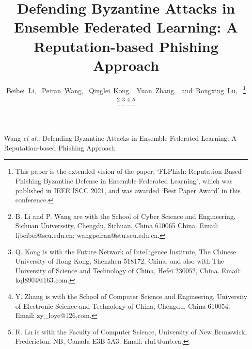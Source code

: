\documentclass[journal]{IEEEtran}
\begin{document}
\title{Defending Byzantine Attacks in Ensemble Federated Learning: A Reputation-based Phishing Approach}


\author{Beibei~Li,~
        Peiran~Wang,~
        Qinglei~Kong,~
        Yuan~Zhang,~
        and~Rongxing~Lu,~
\thanks{This paper is the extended vision of the paper, `FLPhish: Reputation-Based Phishing Byzantine Defense in Ensemble Federated Learning', which was published in IEEE ISCC 2021, and was awarded `Best Paper Award' in this conference.}
\thanks{B. Li and P. Wang are with the School of Cyber Science and Engineering, Sichuan Universsity, Chengdu, Sichuan, China 610065 China. Email: libeibei@scu.edu.cn; wangpeiran@stu.scu.edu.cn.}
\thanks{Q. Kong is with the Future Network of Intelligence Institute, The Chinese University of Hong Kong, Shenzhen 518172, China, and also with The University of Science and Technology of China, Hefei 230052, China. Email: kql8904@163.com.}
\thanks{Y. Zhang is with the School of Computer Science and Engineering, University of Electronic Science and Technology of China, Chengdu, China 610054. Email: zy\_loye@126.com.}
\thanks{R. Lu is with the Faculty of Computer Science, University of New Brunswick, Fredericton, NB, Canada E3B 5A3. Email: rlu1@unb.ca.}
}



%
{Wang \MakeLowercase{\textit{et al.}}: Defending Byzantine Attacks in Ensemble Federated Learning: A Reputation-based Phishing Approach}
\end{document}

